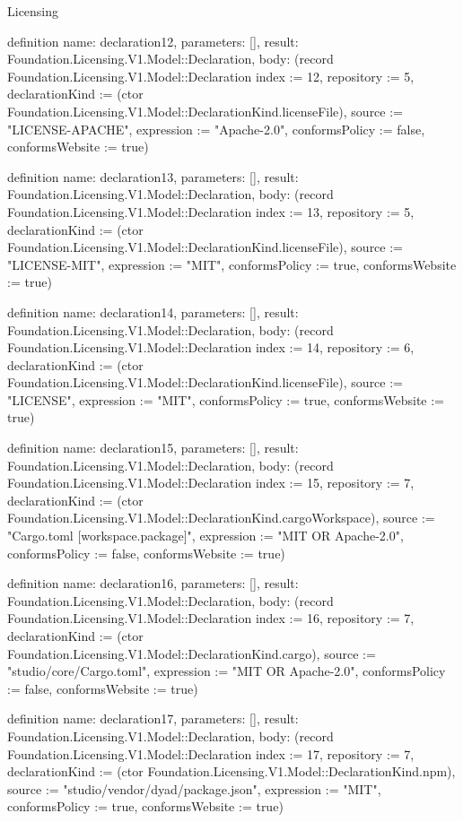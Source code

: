 \begin{lexlean}{Licensing}
\begin{semanticmodule}
definition{
  name: declaration12,
  parameters: [],
  result: Foundation.Licensing.V1.Model::Declaration,
  body: (record Foundation.Licensing.V1.Model::Declaration {index := 12, repository := 5, declarationKind := (ctor Foundation.Licensing.V1.Model::DeclarationKind.licenseFile), source := "LICENSE-APACHE", expression := "Apache-2.0", conformsPolicy := false, conformsWebsite := true})
}

definition{
  name: declaration13,
  parameters: [],
  result: Foundation.Licensing.V1.Model::Declaration,
  body: (record Foundation.Licensing.V1.Model::Declaration {index := 13, repository := 5, declarationKind := (ctor Foundation.Licensing.V1.Model::DeclarationKind.licenseFile), source := "LICENSE-MIT", expression := "MIT", conformsPolicy := true, conformsWebsite := true})
}

definition{
  name: declaration14,
  parameters: [],
  result: Foundation.Licensing.V1.Model::Declaration,
  body: (record Foundation.Licensing.V1.Model::Declaration {index := 14, repository := 6, declarationKind := (ctor Foundation.Licensing.V1.Model::DeclarationKind.licenseFile), source := "LICENSE", expression := "MIT", conformsPolicy := true, conformsWebsite := true})
}

definition{
  name: declaration15,
  parameters: [],
  result: Foundation.Licensing.V1.Model::Declaration,
  body: (record Foundation.Licensing.V1.Model::Declaration {index := 15, repository := 7, declarationKind := (ctor Foundation.Licensing.V1.Model::DeclarationKind.cargoWorkspace), source := "Cargo.toml [workspace.package]", expression := "MIT OR Apache-2.0", conformsPolicy := false, conformsWebsite := true})
}

definition{
  name: declaration16,
  parameters: [],
  result: Foundation.Licensing.V1.Model::Declaration,
  body: (record Foundation.Licensing.V1.Model::Declaration {index := 16, repository := 7, declarationKind := (ctor Foundation.Licensing.V1.Model::DeclarationKind.cargo), source := "studio/core/Cargo.toml", expression := "MIT OR Apache-2.0", conformsPolicy := false, conformsWebsite := true})
}

definition{
  name: declaration17,
  parameters: [],
  result: Foundation.Licensing.V1.Model::Declaration,
  body: (record Foundation.Licensing.V1.Model::Declaration {index := 17, repository := 7, declarationKind := (ctor Foundation.Licensing.V1.Model::DeclarationKind.npm), source := "studio/vendor/dyad/package.json", expression := "MIT", conformsPolicy := true, conformsWebsite := true})
}


\end{semanticmodule}
\end{lexlean}
